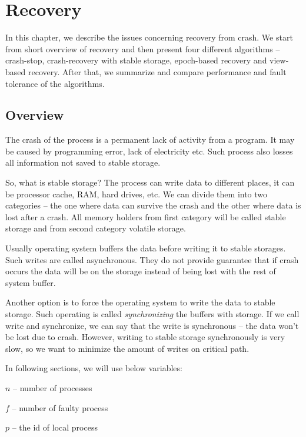 \chapter{Recovery}
\label{chapter:recovery}

In this chapter, we describe the issues concerning recovery from crash. We start from short overview of recovery and then present four different algorithms -- crash-stop, crash-recovery with stable storage, epoch-based recovery and view-based recovery. \linebreak After that, we summarize and compare performance and fault tolerance of the algorithms.

\section{Overview}

The crash of the process is a permanent lack of activity from a program. It may be caused by programming error, lack of electricity etc. Such process also losses all information not saved to stable storage.

So, what is stable storage? The process can write data to different places, it can be processor cache, RAM, hard drives, etc. We can divide them into two categories -- the one where data can survive the crash and the other where data is lost after a crash. All memory holders from first category will be called stable storage and from second category volatile storage.

Usually operating system buffers the data before writing it to stable storages. Such writes are called asynchronous. They do not provide guarantee that if crash occurs the data will be on the storage instead of being lost with the rest of system buffer.

Another option is to force the operating system to write the data to stable storage. Such operating is called \emph{synchronizing} the buffers with storage. If we call write and synchronize, we can say that the write is synchronous -- the data won't be lost due to crash. However, writing to stable storage synchronously is very slow, so we want to minimize the amount of writes on critical path.

In following sections, we will use below variables: 
\begin{tightList}
  \item[$n$] -- number of processes
  \item[$f$] -- number of faulty process
  \item[$p$] -- the id of local process
\end{tightList}

